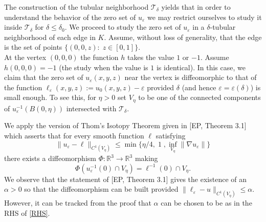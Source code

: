 \documentclass[11pt,reqno]{amsart}
\newcommand{\R}{{\mathbb R}}
\newcommand{\ep}{\varepsilon}
\theoremstyle{definition}
\begin{document}
The construction of the tubular neighborhood $\mathcal T_\delta$ yields that in order to understand the behavior of the zero set of $u_\ep$ we may restrict ourselves to study it inside $\mathcal T_\delta$ for $\delta \leq \delta_0$.
We proceed to study the zero set of $u_\ep$  in a $\delta$-tubular neighborhood of each edge in $K$. Assume, without loss of generality, that the edge is the set of points  $\{(0,0,z):\; z\in [0,1]\}$. \\

At the vertex $(0,0,0)$  the function $h$ takes the value $1$ or $-1$.  Assume $h(0,0,0)=-1$ (the study when the value is $1$ is identical).  In this case, we claim that the zero set of $u_\ep(x,y,z)$ near the vertex is diffeomorphic to that of the function  $\ell_\ep (x,y,z):=u_0(x,y,z)-\ep$ provided $\delta$ (and hence $\ep=\ep(\delta)$) is small enough.  To see this, for  $\eta>0$  set $V_\eta$ to be one of the connected components of $u_\ep^{-1}(B(0, \eta))$ intersected with $\mathcal T_\delta$. 

We apply the version of Thom's Isotopy Theorem given in [EP, Theorem 3.1] which asserts  that for every smooth function $\ell$ satisfying 
 \begin{equation}\label{RHS}
 \|u_\ep -\ell \|_{C^1(V_\eta)}\leq  \min\big\{\eta/4, \; 1\;, \inf_{V_\eta} \|\nabla u_\ep\| \big \}
 \end{equation}
   there exists a diffeomorphism $\Phi:\R^3 \to \R^3$ making 
$$\Phi(u_\ep^{-1}(0) \cap V_\eta) = \ell^{-1}(0) \cap V_\eta.$$ 
    We observe that the statement of  [EP, Theorem 3.1]  gives the existence of an $\alpha>0$ so that   the diffeomorphism can be built provided $\|\ell_\ep-u\|_{C^1(V_\eta)}\leq \alpha$. However, it can be tracked from the proof that $\alpha$ can be chosen to be as in the RHS of \eqref{RHS}. 
    
\end{document}
